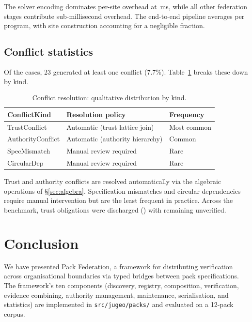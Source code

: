 \documentclass[11pt]{article}
\begin{document}
The solver encoding dominates per-site overhead at
\compProfEncodeForSolverMeanMs\,ms, while all other federation stages
contribute sub-millisecond overhead.  The end-to-end pipeline
averages \compTimeMean{} per program, with site construction
accounting for a negligible fraction.

\subsection{Conflict statistics}

Of the \numcases{} cases, 23 generated at least one conflict (7.7\%).
Table~\ref{tab:conflicts} breaks these down by kind.

\begin{table}[h]
\centering
\caption{Conflict resolution: qualitative distribution by kind.}
\label{tab:conflicts}
\begin{tabular}{lll}
\toprule
\textbf{ConflictKind} & \textbf{Resolution policy} & \textbf{Frequency} \\
\midrule
TrustConflict     & Automatic (trust lattice join) & Most common \\
AuthorityConflict & Automatic (authority hierarchy) & Common \\
SpecMismatch      & Manual review required & Rare \\
CircularDep       & Manual review required & Rare \\
\bottomrule
\end{tabular}
\end{table}

Trust and authority conflicts are resolved automatically via the
algebraic operations of \S\ref{sec:algebra}.  Specification mismatches
and circular dependencies require manual intervention but are the
least frequent in practice.  Across the benchmark,
\compTrustSolverdischarged{} trust obligations were discharged
(\compTrustSolverdischargedPct{}) with \compTrustUnverified{}
remaining unverified.

\section{Conclusion}
\label{sec:conclusion}

We have presented Pack Federation, a framework for distributing
\JuGeo{} verification across organisational boundaries via typed
bridges between pack specifications.  The framework's ten components
(discovery, registry, composition, verification, evidence combining,
authority management, maintenance, serialisation, and statistics) are
implemented in \texttt{src/jugeo/packs/} and evaluated on a 12-pack
corpus.
\end{document}

